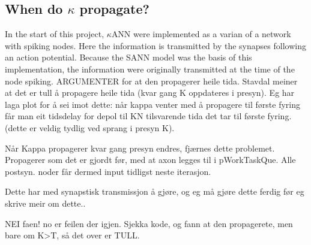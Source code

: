 	\subsection{When do $\kappa$ propagate?} %
	In the start of this project, $\kappa$ANN were implemented as a varian of a network with spiking nodes.
	Here the information is transmitted by the synapses following an action potential. 
	Because the SANN model was the basis of this implementation, the information were originally transmitted at the time of the node spiking.
	ARGUMENTER for at den propagerer heile tida.
Stavdal meiner at det er tull å propagere heile tida (kvar gang K oppdateres i presyn). 
Eg har laga plot for å sei imot dette: når kappa venter med å propagere til første fyring får man eit tidsdelay for depol til KN tilsvarende tida det tar til første fyring. (dette er veldig tydlig ved sprang i presyn K).

Når Kappa propagerer kvar gang presyn endres, fjærnes dette problemet. Propagerer som det er gjordt før, med at axon legges til i pWorkTaskQue. Alle postsyn. noder får dermed input tidligst neste iterasjon.

Dette har med synapstisk transmissjon å gjøre, og eg må gjøre dette ferdig før eg skrive meir om dette..

NEI faen! no er feilen der igjen. Sjekka kode, og fann at den propagerete, men bare om K>T, så det over er TULL.



















